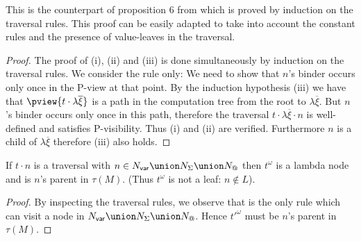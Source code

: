 This is the counterpart of proposition 6 from
\cite{OngHoMchecking2006} which is proved by induction on the
traversal rules. This proof can be easily adapted to take into
account the constant rules and the presence of value-leaves in the
traversal.
\begin{proof}
The proof of (i), (ii) and (iii) is done simultaneously by induction on the traversal rules. We consider the rule  only:
We need to show that $n$'s binder occurs only once in the P-view at that point. By the induction hypothesis (iii) we have that $\pview{t \cdot \lambda \overline{\xi}}$ is a path in the computation tree from the root to $\lambda \overline{\xi}$. But $n$'s binder occurs only once in this path, therefore the traversal $t \cdot \lambda \overline{\xi} \cdot n$ is well-defined and satisfies P-visibility. Thus (i) and (ii) are verified. Furthermore $n$ is a child of $\lambda \overline{\xi}$ therefore (iii) also holds.
\end{proof}



\begin{lemma}
\label{lem:trav_last_not_leaf} If $t \cdot n $ is a traversal with
$n \in N_{\sf var} \union N_\Sigma \union N_@$ then $t^\omega$ is a
lambda node and is $n$'s parent in $\tau(M)$. (Thus $t^\omega$ is
not a leaf: $n\not\in L$).
\end{lemma}
\begin{proof}
By inspecting the traversal rules, we observe that 
is the only rule  which can visit a node in $N_{\sf var} \union
N_\Sigma \union N_@$. Hence $t'^\omega$ must be $n$'s parent in
$\tau(M)$.
\end{proof}


